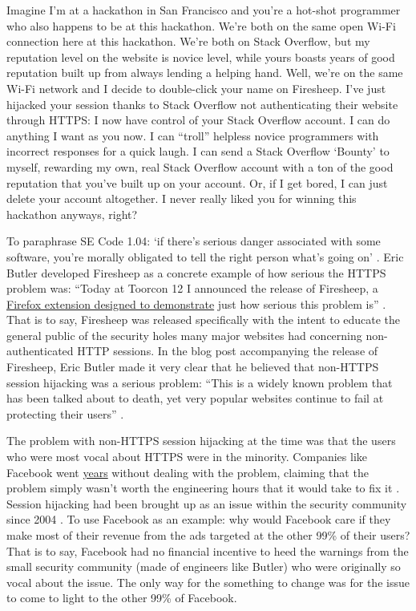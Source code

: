 \documentclass[11pt]{article}
\begin{document}
\begin{multicols}{2}
Imagine I'm at a hackathon in San Francisco and you're a hot-shot programmer who also happens to be at this hackathon. We're both on the same open Wi-Fi connection here at this hackathon. We're both on Stack Overflow, but my reputation level on the website is novice level, while yours boasts years of good reputation built up from always lending a helping hand. Well, we're on the same Wi-Fi network and I decide to double-click your name on Firesheep. I've just hijacked your session thanks to Stack Overflow not authenticating their website through HTTPS: I now have control of your Stack Overflow account. I can do anything I want as you now. I can ``troll'' helpless novice programmers with incorrect responses for a quick laugh. I can send a Stack Overflow `Bounty' to myself, rewarding my own, real Stack Overflow account with a ton of the good reputation that you've built up on your account. Or, if I get bored, I can just delete your account altogether. I never really liked you for winning this hackathon anyways, right?

To paraphrase SE Code 1.04: `if there's serious danger associated with some software, you're morally obligated to tell the right person what's going on' \cite{se-code}. Eric Butler developed Firesheep as a concrete example of how serious the HTTPS problem was: ``Today at Toorcon 12 I announced the release of Firesheep, a \uline{Firefox extension designed to demonstrate} just how serious this problem is'' \cite{eric-butler}. That is to say, Firesheep was released specifically with the intent to educate the general public of the security holes many major websites had concerning non-authenticated HTTP sessions. In the blog post accompanying the release of Firesheep, Eric Butler made it very clear that he believed that non-HTTPS session hijacking was a serious problem: ``This is a widely known problem that has been talked about to death, yet very popular websites continue to fail at protecting their users'' \cite{eric-butler}.

The problem with non-HTTPS session hijacking at the time was that the users who were most vocal about HTTPS were in the minority. Companies like Facebook went \uline{years} without dealing with the problem, claiming that the problem simply wasn't worth the engineering hours that it would take to fix it \cite{firesheep-day-later}. Session hijacking had been brought up as an issue within the security community since 2004 \cite{firesheep-day-later}. To use Facebook as an example: why would Facebook care if they make most of their revenue from the ads targeted at the other 99\% of their users? That is to say, Facebook had no financial incentive to heed the warnings from the small security community (made of engineers like Butler) who were originally so vocal about the issue. The only way for the something to change was for the issue to come to light to the other 99\% of Facebook.


\end{multicols}
\end{document}
